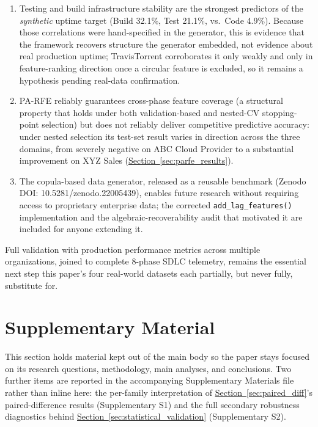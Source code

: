 \documentclass[technologies,article,submit,pdftex,moreauthors]{Definitions/mdpi}
\begin{document}
\begin{enumerate}
\item
  Testing and build infrastructure stability are the strongest predictors of the \emph{synthetic} uptime target (Build 32.1\%, Test 21.1\%, vs.~Code 4.9\%). Because those correlations were hand-specified in the generator, this is evidence that the framework recovers structure the generator embedded, not evidence about real production uptime; TravisTorrent corroborates it only weakly and only in feature-ranking direction once a circular feature is excluded, so it remains a hypothesis pending real-data confirmation.
\item
  PA-RFE reliably guarantees cross-phase feature coverage (a structural property that holds under both validation-based and nested-CV stopping-point selection) but does not reliably deliver competitive predictive accuracy: under nested selection its test-set result varies in direction across the three domains, from severely negative on ABC Cloud Provider to a substantial improvement on XYZ Sales (\hyperref[sec:parfe_results]{Section~\ref*{sec:parfe_results}}).
\item
  The copula-based data generator, released as a reusable benchmark (Zenodo DOI: 10.5281/zenodo.22005439), enables future research without requiring access to proprietary enterprise data; the corrected \texttt{add\_lag\_features()} implementation and the algebraic-recoverability audit that motivated it are included for anyone extending it.
\end{enumerate}

Full validation with production performance metrics across multiple organizations, joined to complete 8-phase SDLC telemetry, remains the essential next step this paper's four real-world datasets each partially, but never fully, substitute for.

\section{Supplementary Material}\label{sec:supplementary}

This section holds material kept out of the main body so the paper stays focused on its research questions, methodology, main analyses, and conclusions. Two further items are reported in the accompanying Supplementary Materials file rather than inline here: the per-family interpretation of \hyperref[sec:paired_diff]{Section~\ref*{sec:paired_diff}}'s paired-difference results (Supplementary S1) and the full secondary robustness diagnostics behind \hyperref[sec:statistical_validation]{Section~\ref*{sec:statistical_validation}} (Supplementary S2).
\end{document}
